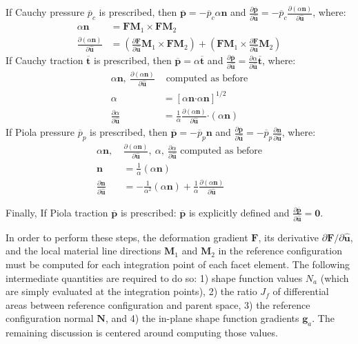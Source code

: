 If Cauchy pressure $\overline{p}_c$ is prescribed, then $\bm {\overline{p}} = {-\overline{p}_c}\alpha{\bm n}$ and $\frac{\partial \overline{\bm{p}}}{\partial \hat {\bm{u}}} = {-\overline{p}_c}\frac{\partial (\alpha {\bm n})}{\partial {\hat {\bm{u}}}}$, where:
\begin{align}
\alpha{\bm n} &= {\bm F}{\bm M}_1 \times {\bm F}{\bm M}_2 \\
\frac{\partial (\alpha{\bm n})}{\partial {\hat {\bm{u}}}} &= (\frac{\partial {\bm F}}{\partial {\hat {\bm{u}}}}{\bm M}_1 \times {\bm F}{\bm M}_2) + ({\bm F}{\bm M}_1 \times \frac{\partial {\bm F}}{\partial {\hat {\bm{u}}}}{\bm M}_2)
\end{align}
If Cauchy traction $\overline{\bm{t}}$ is prescribed, then $\overline{\bm{p}} = \alpha{\overline{\bm{t}}}$ and $\frac{\partial \overline{\bm{p}}}{\partial {\hat {\bm{u}}}} = \frac{\partial \alpha}{\partial {\hat {\bm{u}}}}{\overline{\bm{t}}}$, where:
\begin{align}
{\alpha \bm n}, \ \frac{\partial (\alpha {\bm n})}{\partial {\hat {\bm{u}}}} &\text{ computed as before} \nonumber \\
\alpha &= [\alpha {\bm n} \bm{\cdot} \alpha {\bm n}]^{1/2} \\
 \frac{\partial{\alpha}}{\partial {\hat {\bm{u}}}} &= \frac{1}{\alpha}\frac{\partial({\alpha {\bm n}})}{\partial {\hat {\bm{u}}}} \bm{\cdot} ({\alpha \bm n})
\end{align}
If Piola pressure $\overline{p}_p$ is prescribed, then $\overline{\bm{p}} = {-\overline{p}_p}{\bm n}$ and $\frac{\partial \overline{\bm{p}}}{\partial {\hat {\bm{u}}}} = {-\overline{p}_p}\frac{\partial {\bm n}}{\partial {\hat {\bm{u}}}}$, where:
\begin{align}
{\alpha \bm n}, \ &\frac{\partial (\alpha {\bm n})}{\partial {\hat {\bm{u}}}}, \ \alpha, \ \frac{\partial \alpha}{\partial {\hat {\bm{u}}}} \text{ computed as before} \nonumber \\
{\bm n} &= \frac{1}{\alpha}(\alpha {\bm n}) \\
\frac{\partial {\bm n}}{\partial {\hat {\bm{u}}}} &= -\frac{1}{\alpha^2}(\alpha {\bm n}) + \frac{1}{\alpha}\frac{\partial (\alpha{\bm n})}{\partial {\hat {\bm{u}}}}
\end{align}

Finally, If Piola traction $\overline{\bm{p}}$ is prescribed: $\overline{\bm{p}}$ is explicitly defined and $\frac{\partial \overline{\bm{p}}}{\partial {\hat {\bm{u}}}} = {\bm 0}$.

In order to perform these steps, the deformation gradient $\bm{F}$, its derivative ${\partial \bm{F}}/{\partial \hat{\bm{u}}}$, and the local material line directions $\bm{M}_1$ and $\bm{M}_2$ in the reference configuration must be computed for each integration point of each facet element. The following intermediate quantities are required to do so: 1) shape function values $N_a$ (which are simply evaluated at the integration points), 2) the ratio $J_f$ of differential areas between reference configuration and parent space, 3) the reference configuration normal ${\bm {N}}$, and 4) the in-plane shape function gradients ${\bm {g}}_a$. The remaining discussion is centered around computing those values.

